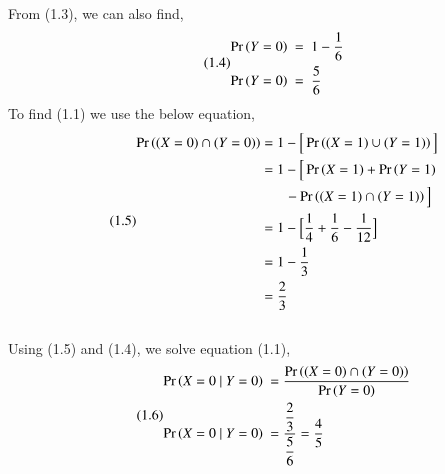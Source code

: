 \documentclass[journal,12pt,twocolumn]{IEEEtran}
\begin{document}
From (1.3), we can also find,
\begin{align}\tag{1.4}
    \begin{split}
        \Pr\left(Y=0\right)\ &=\ 1 - \dfrac{1}{6}\\
        \Pr\left(Y=0\right)\ &=\ \dfrac{5}{6}\\
    \end{split}
\end{align}
To find (1.1) we use the below equation,
\begin{align}\tag{1.5}
    \begin{split}
        \Pr\left((X=0) \cap (Y=0)\right) &= 1 - \Big[\Pr\left((X=1) \cup (Y=1)\right)\Big]\\
        &= 1 - \Big[\Pr\left(X=1\right) + \Pr\left(Y=1\right)\\
        & \ \ \ \ \ \ \ - \Pr\left((X=1) \cap (Y=1)\right)\Big]\\
        &= 1 - \Big[\dfrac{1}{4} + \dfrac{1}{6} - \dfrac{1}{12}\Big]\\
        &= 1 - \dfrac{1}{3}\\
        &= \dfrac{2}{3}
    \end{split}
\end{align}
\\Using (1.5) and (1.4), we solve equation (1.1),
\begin{align}\tag{1.6}
    \begin{split}
        \Pr\left(X=0\ |\ Y=0\right)\ &= \dfrac{\Pr\left((X=0) \cap (Y=0)\right)}{\Pr\left(Y=0\right)}\\
        \Pr\left(X=0\ |\ Y=0\right)\ &= \dfrac{\dfrac{2}{3}}{\dfrac{5}{6}} = \dfrac{4}{5}\\
    \end{split}
\end{align}
\end{document}
